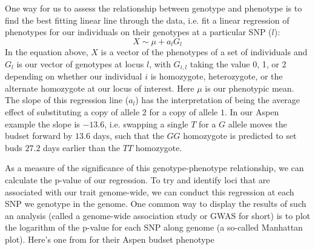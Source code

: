 One way for us to assess the relationship between
genotype and phenotype is to find the best fitting linear line through the data, i.e. fit a linear regression of
phenotypes for our individuals on their genotypes at a particular SNP ($l$):
\begin{equation}
X \sim \mu + a_l G_{l}
\end{equation}
In the equation above, $X$ is a vector of the phenotypes of a set of individuals and $G_{l}$ is our vector of genotypes at locus $l$, with $G_{i,l}$ taking the value 0, 1, or 2 depending on whether our individual $i$ is homozygote, heterozygote, or the alternate homozygote at our locus of interest. Here $\mu$ is our phenotypic mean. The slope of this regression line ($a_l$) has the interpretation of being the average
effect of substituting a copy of allele $2$ for a copy of allele
$1$. In our Aspen example the slope is $-13.6$, i.e. swapping a single $T$ for a $G$ allele
moves the budset forward by $13.6$ days, such that the $GG$ homozygote
is predicted to set buds $27.2$ days earlier than the $TT$ homozygote.   


As a measure of the significance of this genotype-phenotype relationship, we can
calculate the p-value of our regression. To try and identify loci
that are associated with our trait genome-wide, we can conduct this
regression at each SNP we genotype in the genome. One common way to display the
results of such an analysis (called a genome-wide association study or GWAS for short) is to plot the logarithm of the p-value for each SNP along
genome (a so-called Manhattan plot). Here's one from 
\citet{wang:18} for their Aspen budset phenotype


